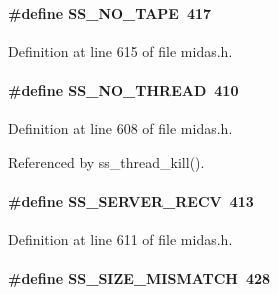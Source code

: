 \paragraph[{SS\_\-NO\_\-TAPE}]{\setlength{\rightskip}{0pt plus 5cm}\#define SS\_\-NO\_\-TAPE~417}\hfill\label{group__err24_ga9ac796b5448c9009c8135524ab4ede4e}

\begin{DoxyItemize}
\item 
\end{DoxyItemize}

Definition at line 615 of file midas.h.
\paragraph[{SS\_\-NO\_\-THREAD}]{\setlength{\rightskip}{0pt plus 5cm}\#define SS\_\-NO\_\-THREAD~410}\hfill\label{group__err24_ga164e3fc92adb05840a3442728c181793}

\begin{DoxyItemize}
\item 
\end{DoxyItemize}

Definition at line 608 of file midas.h.

Referenced by ss\_\-thread\_\-kill().
\paragraph[{SS\_\-SERVER\_\-RECV}]{\setlength{\rightskip}{0pt plus 5cm}\#define SS\_\-SERVER\_\-RECV~413}\hfill\label{group__err24_ga3f947813c830bdf148673ad0c29e00f7}

\begin{DoxyItemize}
\item 
\end{DoxyItemize}

Definition at line 611 of file midas.h.
\paragraph[{SS\_\-SIZE\_\-MISMATCH}]{\setlength{\rightskip}{0pt plus 5cm}\#define SS\_\-SIZE\_\-MISMATCH~428}\hfill\label{group__err24_ga5fb7e0f4f8012a34514c319989e50143}

